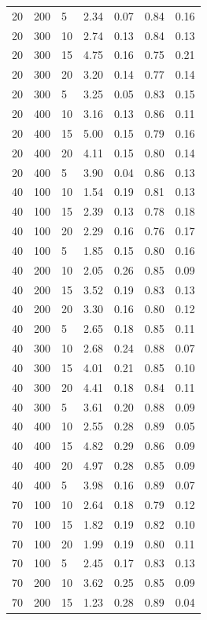 \documentclass{article}
\begin{document}
\begin{table}[h]
\begin{tabular}{l l l l l l l}
20 & 200 & 5 & 2.34 & 0.07 & 0.84 & 0.16 \\
20 & 300 & 10 & 2.74 & 0.13 & 0.84 & 0.13 \\
20 & 300 & 15 & 4.75 & 0.16 & 0.75 & 0.21 \\
20 & 300 & 20 & 3.20 & 0.14 & 0.77 & 0.14 \\
20 & 300 & 5 & 3.25 & 0.05 & 0.83 & 0.15 \\
20 & 400 & 10 & 3.16 & 0.13 & 0.86 & 0.11 \\
20 & 400 & 15 & 5.00 & 0.15 & 0.79 & 0.16 \\
20 & 400 & 20 & 4.11 & 0.15 & 0.80 & 0.14 \\
20 & 400 & 5 & 3.90 & 0.04 & 0.86 & 0.13 \\
40 & 100 & 10 & 1.54 & 0.19 & 0.81 & 0.13 \\
40 & 100 & 15 & 2.39 & 0.13 & 0.78 & 0.18 \\
40 & 100 & 20 & 2.29 & 0.16 & 0.76 & 0.17 \\
40 & 100 & 5 & 1.85 & 0.15 & 0.80 & 0.16 \\
40 & 200 & 10 & 2.05 & 0.26 & 0.85 & 0.09 \\
40 & 200 & 15 & 3.52 & 0.19 & 0.83 & 0.13 \\
40 & 200 & 20 & 3.30 & 0.16 & 0.80 & 0.12 \\
40 & 200 & 5 & 2.65 & 0.18 & 0.85 & 0.11 \\
40 & 300 & 10 & 2.68 & 0.24 & 0.88 & 0.07 \\
40 & 300 & 15 & 4.01 & 0.21 & 0.85 & 0.10 \\
40 & 300 & 20 & 4.41 & 0.18 & 0.84 & 0.11 \\
40 & 300 & 5 & 3.61 & 0.20 & 0.88 & 0.09 \\
40 & 400 & 10 & 2.55 & 0.28 & 0.89 & 0.05 \\
40 & 400 & 15 & 4.82 & 0.29 & 0.86 & 0.09 \\
40 & 400 & 20 & 4.97 & 0.28 & 0.85 & 0.09 \\
40 & 400 & 5 & 3.98 & 0.16 & 0.89 & 0.07 \\
70 & 100 & 10 & 2.64 & 0.18 & 0.79 & 0.12 \\
70 & 100 & 15 & 1.82 & 0.19 & 0.82 & 0.10 \\
70 & 100 & 20 & 1.99 & 0.19 & 0.80 & 0.11 \\
70 & 100 & 5 & 2.45 & 0.17 & 0.83 & 0.13 \\
70 & 200 & 10 & 3.62 & 0.25 & 0.85 & 0.09 \\
70 & 200 & 15 & 1.23 & 0.28 & 0.89 & 0.04 \\

\end{tabular}
\end{table}
\end{document}
